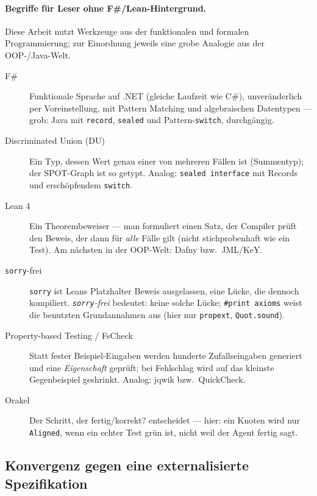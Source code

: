 \documentclass[11pt,a4paper]{article}
\theoremstyle{definition}
\theoremstyle{remark}
\begin{document}
\paragraph{Begriffe für Leser ohne F\#/Lean-Hintergrund.}
Diese Arbeit nutzt Werkzeuge aus der funktionalen und formalen Programmierung; zur
Einordnung jeweils eine grobe Analogie aus der OOP-/Java-Welt.
\begin{description}
  \item[F\#] Funktionale Sprache auf .NET (gleiche Laufzeit wie C\#), unveränderlich per
    Voreinstellung, mit Pattern Matching und algebraischen Datentypen --- grob: Java mit
    \texttt{record}, \texttt{sealed} und Pattern-\texttt{switch}, durchgängig.
  \item[Discriminated Union (DU)] Ein Typ, dessen Wert genau einer von mehreren Fällen ist
    (Summentyp); der SPOT-Graph ist so getypt. Analog: \texttt{sealed interface} mit Records
    und erschöpfendem \texttt{switch}.
  \item[Lean 4] Ein Theorembeweiser --- man formuliert einen Satz, der Compiler prüft den
    Beweis, der dann für \emph{alle} Fälle gilt (nicht stichprobenhaft wie ein Test). Am
    nächsten in der OOP-Welt: Dafny bzw.\ JML/KeY.
  \item[\texttt{sorry}-frei] \texttt{sorry} ist Leans Platzhalter \glqq Beweis ausgelassen\grqq{}, eine
    Lücke, die dennoch kompiliert. \emph{\texttt{sorry}-frei} bedeutet: keine solche Lücke;
    \texttt{\#print axioms} weist die benutzten Grundannahmen aus (hier nur \texttt{propext},
    \texttt{Quot.sound}).
  \item[Property-based Testing / FsCheck] Statt fester Beispiel-Eingaben werden hunderte
    Zufallseingaben generiert und eine \emph{Eigenschaft} geprüft; bei Fehlschlag wird auf das
    kleinste Gegenbeispiel \glqq geshrinkt\grqq{}. Analog: jqwik bzw.\ QuickCheck.
  \item[Orakel] Der Schritt, der \glqq fertig/korrekt?\grqq{} entscheidet --- hier: ein Knoten wird nur
    \texttt{Aligned}, wenn ein echter Test grün ist, nicht weil \glqq der Agent fertig sagt\grqq{}.
\end{description}

\subsection{Konvergenz gegen eine externalisierte Spezifikation}
\label{sec:konvergenz}
\end{document}
